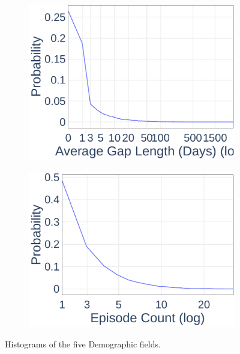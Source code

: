 \begin{figure}[ht]
	\begin{subfigure}[b]{0.3\textwidth}
    \includegraphics[width=\textwidth]{Figures/Data-AvgGapLen-PDF}
  \end{subfigure}
	\begin{subfigure}[b]{0.3\textwidth}
    \includegraphics[width=\textwidth]{Figures/Data-TotalEpisodes-PDF}
  \end{subfigure}
	\caption{Histograms of the five Demographic fields.}
	\label{fig:demopdf}
\end{figure}



